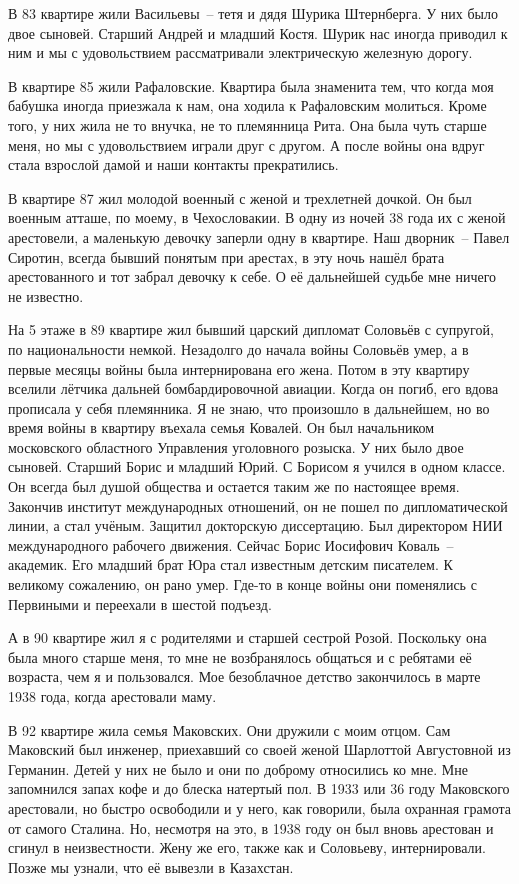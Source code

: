 В 83 квартире жили Васильевы~-- тетя и дядя Шурика Штернберга. У них было двое сыновей. Старший Андрей и младший Костя. Шурик нас иногда приводил к ним и мы с удовольствием рассматривали электрическую железную дорогу.

В квартире 85 жили Рафаловские. Квартира была знаменита тем, что когда моя бабушка иногда приезжала к нам, она ходила к Рафаловским молиться. Кроме того, у них жила не то внучка, не то племянница Рита. Она была чуть старше меня, но мы с удовольствием играли друг с другом. А после войны она вдруг стала взрослой дамой и наши контакты прекратились.

В квартире 87 жил молодой военный с женой и трехлетней дочкой. Он был военным атташе, по моему, в Чехословакии. В одну из ночей 38 года их с женой арестовели, а маленькую девочку заперли одну в квартире. Наш дворник~-- Павел Сиротин, всегда бывший понятым при арестах, в эту ночь нашёл брата арестованного и тот забрал девочку к себе. О её дальнейшей судьбе мне ничего не известно.

На 5 этаже в 89 квартире жил бывший царский дипломат Соловьёв с супругой, по национальности немкой. Незадолго до начала войны Соловьёв умер, а в первые месяцы войны была интернирована его жена. Потом в эту квартиру вселили лётчика дальней бомбардировочной авиации. Когда он погиб, его вдова прописала у себя племянника. Я не знаю, что произошло в дальнейшем, но во время войны в квартиру въехала семья Ковалей. Он был начальником московского областного Управления уголовного розыска. У них было двое сыновей. Старший Борис и младший Юрий. С Борисом я учился в одном классе. Он всегда был душой общества и остается таким же по настоящее время. Закончив институт международных отношений, он не пошел по дипломатической линии, а стал учёным. Защитил докторскую диссертацию. Был директором НИИ международного рабочего движения. Сейчас Борис Иосифович Коваль~-- академик. Его младший брат Юра стал известным детским писателем. К великому сожалению, он рано умер. Где-то в конце войны они поменялись с Первиными и переехали в шестой подъезд.

А в 90 квартире жил я с родителями и старшей сестрой Розой. Поскольку она была много старше меня, то мне не возбранялось общаться и с ребятами её возраста, чем я и пользовался. Мое безоблачное детство закончилось в марте 1938 года, когда арестовали маму.

В 92 квартире жила семья Маковских. Они дружили с моим отцом. Сам Маковский был инженер, приехавший со своей женой Шарлоттой Августовной из Германин. Детей у них не было и они по доброму относились ко мне. Мне запомнился запах кофе и до блеска натертый пол. В 1933 или 36 году Маковского арестовали, но быстро освободили и у него, как говорили, была охранная грамота от самого Сталина. Но, несмотря на это, в 1938 году он был вновь арестован и сгинул в неизвестности. Жену же его, также как и Соловьеву, интернировали. Позже мы узнали, что её вывезли в Казахстан. 

